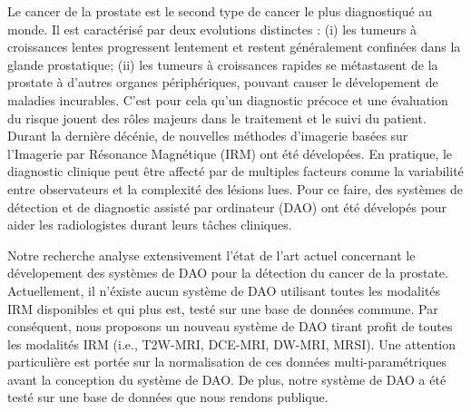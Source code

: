 \begin{abstractFrench}

Le cancer de la prostate est le second type de cancer le plus diagnostiqu\'e au monde.
Il est caract\'eris\'e par deux evolutions distinctes : (i) les tumeurs \`a croissances lentes progressent lentement et restent g\'en\'eralement confin\'ees dans la glande prostatique; (ii) les tumeurs \`a croissances rapides se m\'etastasent de la prostate \`a d'autres organes p\'eriph\'eriques, pouvant causer le d\'evelopement de maladies incurables.
C'est pour cela qu'un diagnostic pr\'ecoce et une \'evaluation du risque jouent des r\^oles majeurs dans le traitement et le suivi du patient.
Durant la derni\`ere d\'ec\'enie, de nouvelles m\'ethodes d'imagerie bas\'ees sur l'Imagerie par R\'esonance Magn\'etique (IRM) ont \'et\'e d\'evelop\'ees.
En pratique, le diagnostic clinique peut \^etre affect\'e par de multiples facteurs comme la variabilit\'e entre observateurs et la complexit\'e des l\'esions lues.
Pour ce faire, des syst\`emes de d\'etection et de diagnostic assist\'e par ordinateur (DAO) ont \'et\'e d\'evelop\'es pour aider les radiologistes durant leurs t\^aches cliniques.

Notre recherche analyse extensivement l'\'etat de l'art actuel concernant le d\'evelopement des syst\`emes de DAO pour la d\'etection du cancer de la prostate.
Actuellement, il n'\'existe aucun syst\`eme de DAO utilisant toutes les modalit\'es IRM disponibles et qui plus est, test\'e sur une base de donn\'ees commune.
Par cons\'equent, nous proposons un nouveau syst\`eme de DAO tirant profit de toutes les modalit\'es IRM (i.e., T2W-MRI, DCE-MRI, DW-MRI, MRSI).
Une attention particuli\`ere est port\'ee sur la normalisation de ces donn\'ees multi-param\'etriques avant la conception du syst\`eme de DAO.
De plus, notre syst\`eme de DAO a \'et\'e test\'e sur une base de donn\'ees que nous rendons publique.

\end{abstractFrench}
